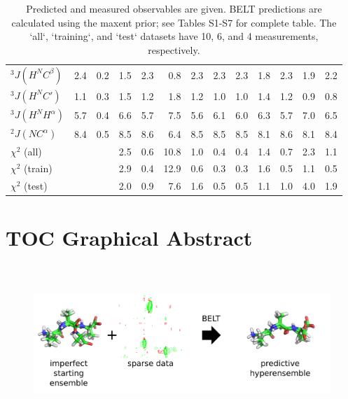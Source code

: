 \documentclass[journal=jacsat,manuscript=article]{achemso}
\begin{document}
\begin{table}
\begin{tabular}{lrrrrrrrrrrrr}
$^3J(H^NC^\beta)$     &  2.4 &          0.2 &      1.5 &             2.3 &      0.8 &             2.3 &                2.3 &                       2.3 &       1.8 &              2.3 &     1.9 &            2.2 \\
$^3J(H^NC\prime)$ &  1.1 &          0.3 &      1.5 &             1.2 &      1.8 &             1.2 &                1.0 &                       1.0 &       1.4 &              1.2 &     0.9 &            0.8 \\
$^3J(H^NH^\alpha)$     &  5.7 &          0.4 &      6.6 &             5.7 &      7.5 &             5.6 &                6.1 &                       6.0 &       6.3 &              5.7 &     7.0 &            6.5 \\
$^2J(NC^\alpha)$      &  8.4 &          0.5 &      8.5 &             8.6 &      6.4 &             8.5 &                8.5 &                       8.5 &       8.1 &              8.6 &     8.1 &            8.4 \\
$\chi^2$ (all)                           &    &            &      2.5 &             0.6 &     10.8 &             1.0 &                0.4 &                       0.4 &       1.4 &              0.7 &     2.3 &            1.1 \\
$\chi^2$ (train)                         &    &            &      2.9 &             0.4 &     12.9 &             0.6 &                0.3 &                       0.3 &       1.6 &              0.5 &     1.1 &            0.5 \\
$\chi^2$ (test)                          &    &            &      2.0 &             0.9 &      7.6 &             1.6 &                0.5 &                       0.5 &       1.1 &              1.0 &     4.0 &            1.9 \\
\bottomrule
\end{tabular}
\caption{
Predicted and measured observables are given.  BELT predictions are calculated using the maxent prior; see Tables S1-S7 for complete table.  The `all`, `training`, and `test` datasets have 10, 6, and 4 measurements, respectively.  
}
\label{table:Predictions}
\end{table}

\clearpage




\clearpage

\section{TOC Graphical Abstract}

\begin{figure}

\includegraphics[height=6.0cm]{figures/new_info_graphic/info_graphic.png}

\end{figure}
\end{document}
